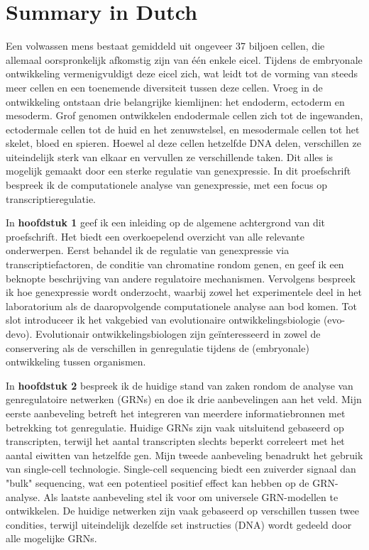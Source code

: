 \section{Summary in Dutch}

Een volwassen mens bestaat gemiddeld uit ongeveer 37 biljoen cellen, die allemaal oorspronkelijk afkomstig zijn van \'e\'en enkele eicel. Tijdens de embryonale ontwikkeling vermenigvuldigt deze eicel zich, wat leidt tot de vorming van steeds meer cellen en een toenemende diversiteit tussen deze cellen. Vroeg in de ontwikkeling ontstaan drie belangrijke kiemlijnen: het endoderm, ectoderm en mesoderm. Grof genomen ontwikkelen endodermale cellen zich tot de ingewanden, ectodermale cellen tot de huid en het zenuwstelsel, en mesodermale cellen tot het skelet, bloed en spieren. Hoewel al deze cellen hetzelfde DNA delen, verschillen ze uiteindelijk sterk van elkaar en vervullen ze verschillende taken. Dit alles is mogelijk gemaakt door een sterke regulatie van genexpressie. In dit proefschrift bespreek ik de computationele analyse van genexpressie, met een focus op transcriptieregulatie.

In \textbf{hoofdstuk 1} geef ik een inleiding op de algemene achtergrond van dit proefschrift. Het biedt een overkoepelend overzicht van alle relevante onderwerpen. Eerst behandel ik de regulatie van genexpressie via transcriptiefactoren, de conditie van chromatine rondom genen, en geef ik een beknopte beschrijving van andere regulatoire mechanismen. Vervolgens bespreek ik hoe genexpressie wordt onderzocht, waarbij zowel het experimentele deel in het laboratorium als de daaropvolgende computationele analyse aan bod komen. Tot slot introduceer ik het vakgebied van evolutionaire ontwikkelingsbiologie (evo-devo). Evolutionair ontwikkelingsbiologen zijn geïnteresseerd in zowel de conservering als de verschillen in genregulatie tijdens de (embryonale) ontwikkeling tussen organismen.

In \textbf{hoofdstuk 2} bespreek ik de huidige stand van zaken rondom de analyse van genregulatoire netwerken (GRNs) en doe ik drie aanbevelingen aan het veld. Mijn eerste aanbeveling betreft het integreren van meerdere informatiebronnen met betrekking tot genregulatie. Huidige GRNs zijn vaak uitsluitend gebaseerd op transcripten, terwijl het aantal transcripten slechts beperkt correleert met het aantal eiwitten van hetzelfde gen. Mijn tweede aanbeveling benadrukt het gebruik van single-cell technologie. Single-cell sequencing biedt een zuiverder signaal dan "bulk" sequencing, wat een potentieel positief effect kan hebben op de GRN-analyse. Als laatste aanbeveling stel ik voor om universele GRN-modellen te ontwikkelen. De huidige netwerken zijn vaak gebaseerd op verschillen tussen twee condities, terwijl uiteindelijk dezelfde set instructies (DNA) wordt gedeeld door alle mogelijke GRNs.

